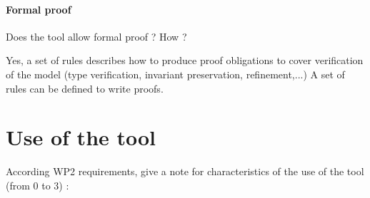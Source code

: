 \paragraph{Formal proof}
Does the tool allow formal proof ?  How ?

\begin{author_comment}
Yes, a set of rules describes how to  produce proof obligations to cover verification of the model (type verification, invariant preservation, refinement,...)
A set of rules can be defined to  write proofs.  
\end{author_comment}

\section{Use of the tool}


According WP2 requirements, give a note for characteristics of the use of the tool (from 0 to 3) :

